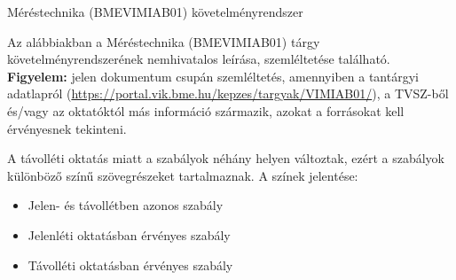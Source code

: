 \documentclass[a4paper,12pt]{article}
\newcommand{\jelenlet}{\color{gray}}
\newcommand{\tavollet}{\color{red}}
\begin{document}
	\begin{center}
		\LARGE Méréstechnika (BMEVIMIAB01) követelményrendszer
	\end{center}
	Az alábbiakban a Méréstechnika (BMEVIMIAB01) tárgy követelményrendszerének nemhivatalos leírása, szemléltetése található. \textbf{Figyelem:} jelen dokumentum csupán szemléltetés, amennyiben a tantárgyi adatlapról (\url{https://portal.vik.bme.hu/kepzes/targyak/VIMIAB01/}), a TVSZ-ből és/vagy az oktatóktól más információ származik, azokat a forrásokat kell érvényesnek tekinteni.
	
	A távolléti oktatás miatt a szabályok néhány helyen változtak, ezért a szabályok különböző színű szövegrészeket tartalmaznak. A színek jelentése:
	\begin{itemize}
		\item Jelen- és távollétben azonos szabály
		\item {\jelenlet Jelenléti oktatásban érvényes szabály}
		\item {\tavollet Távolléti oktatásban érvényes szabály}
	\end{itemize}
	
\end{document}
